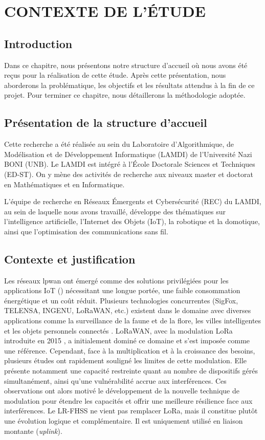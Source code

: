 \chapter{CONTEXTE DE L'ÉTUDE}

\section{Introduction}
Dans ce chapitre, nous présentons notre structure d'accueil où nous avons été reçus pour la réalisation de cette étude.
Après cette présentation, nous aborderons la problématique, les objectifs et les résultats attendus à la fin de ce projet. Pour terminer ce chapitre, nous détaillerons la méthodologie adoptée.

\section{Présentation de la structure d'accueil}

Cette recherche a été réalisée au sein du Laboratoire d'Algorithmique, de Modélisation et de Développement Informatique (LAMDI) de l'Université Nazi BONI (UNB). Le LAMDI est intégré à l'École Doctorale Sciences et Techniques (ED-ST). On y mène des activités de recherche aux niveaux master et doctorat en Mathématiques et en Informatique. 

L'équipe de recherche en Réseaux Émergents et Cybersécurité (REC) du LAMDI, au sein de laquelle nous avons travaillé, développe des thématiques sur l'intelligence artificielle, l'Internet des Objets (IoT), la robotique et la domotique, ainsi que l'optimisation des communications sans fil.

\section{Contexte et justification}

Les réseaux \gls{lpwan} ont émergé comme des solutions privilégiées pour les applications IoT (\IoT) nécessitant une longue portée, une faible consommation énergétique et un coût réduit. Plusieurs technologies concurrentes (SigFox, TELENSA, INGENU, LoRaWAN, etc.) existent dans le domaine avec diverses applications comme la surveillance de la faune et de la flore, les villes intelligentes et les objets personnels connectés \cite{Raza2017LPWANSurvey}. LoRaWAN, avec la modulation LoRa introduite en 2015 \cite{LoRaWANv1_0_2015}, a initialement dominé ce domaine et s'est imposée comme une référence. Cependant, face à la multiplication et à la croissance des besoins, plusieurs études ont rapidement souligné les limites de cette modulation. Elle présente notamment une capacité restreinte quant au nombre de dispositifs gérés simultanément, ainsi qu'une vulnérabilité accrue aux interférences. Ces observations ont alors motivé le développement de la nouvelle technique de modulation \LRFHSS pour étendre les capacités et offrir une meilleure résilience face aux interférences. Le LR-FHSS ne vient pas remplacer LoRa, mais il constitue plutôt une évolution logique et complémentaire. Il est uniquement utilisé en liaison montante (\textit{uplink}).


